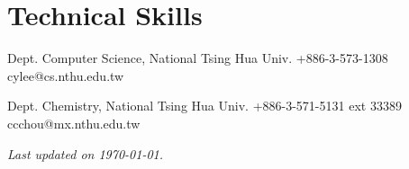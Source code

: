\documentclass{cvclass}
\begin{document}


\section{Technical Skills}

\begin{plainitemize}{}
\end{plainitemize}


\begin{references}

    {Dept. Computer Science, National Tsing Hua Univ.}
    {+886-3-573-1308}
    {cylee@cs.nthu.edu.tw}

    {Dept. Chemistry, National Tsing Hua Univ.}
    {+886-3-571-5131 ext 33389}
    {ccchou@mx.nthu.edu.tw}

\end{references}

\vfill\hfill \small \em Last updated on \today.
\end{document}
